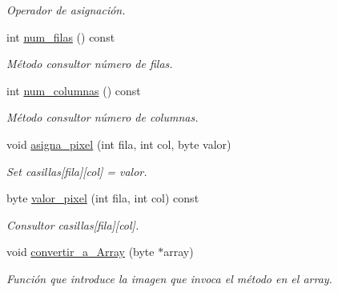 \begin{DoxyCompactItemize}
\begin{DoxyCompactList}\small\item\em Operador de asignación. \end{DoxyCompactList}\item 
int \hyperlink{classImagen_a4cb4faa04f5e2913965e43a6a65acfd1}{num\+\_\+filas} () const
\begin{DoxyCompactList}\small\item\em Método consultor número de filas. \end{DoxyCompactList}\item 
int \hyperlink{classImagen_ac28d55c18064aea2a65e6fcf51d86191}{num\+\_\+columnas} () const
\begin{DoxyCompactList}\small\item\em Método consultor número de columnas. \end{DoxyCompactList}\item 
void \hyperlink{classImagen_af9ac39daf075288473967839d9a0d2d8}{asigna\+\_\+pixel} (int fila, int col, byte valor)
\begin{DoxyCompactList}\small\item\em Set casillas\mbox{[}fila\mbox{]}\mbox{[}col\mbox{]} = valor. \end{DoxyCompactList}\item 
byte \hyperlink{classImagen_a7d9378695a7fd2dce8092f180e716229}{valor\+\_\+pixel} (int fila, int col) const
\begin{DoxyCompactList}\small\item\em Consultor casillas\mbox{[}fila\mbox{]}\mbox{[}col\mbox{]}. \end{DoxyCompactList}\item 
void \hyperlink{classImagen_a22e4df82f04b96f681af25a95b5d976f}{convertir\+\_\+a\+\_\+\+Array} (byte $\ast$array)
\begin{DoxyCompactList}\small\item\em Función que introduce la imagen que invoca el método en el array. \end{DoxyCompactList}\end{DoxyCompactItemize}
